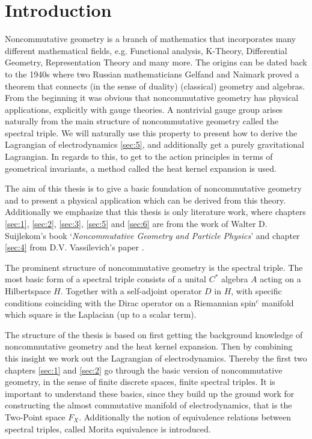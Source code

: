 \section{Introduction}
Noncommutative geometry is a branch of mathematics that incorporates many
different mathematical fields, e.g. Functional analysis, K-Theory,
Differential Geometry, Representation Theory and many more. The origins can
be dated back to the 1940s where two Russian mathematicians Gelfand and
Naimark proved a theorem that connects (in the sense of duality) (classical)
geometry and algebras. From the beginning it was obvious that noncommutative
geometry has physical applications, explicitly with gauge theories. A
nontrivial gauge group arises naturally from the main structure of
noncommutative geometry called the spectral triple. We will naturally use
this property to present how to derive the Lagrangian of electrodynamics
\ref{sec:5}, and additionally get a purely gravitational Lagrangian.
In regards to this, to get to the action principles in terms of geometrical
invariants, a method called the heat kernel expansion is used.

The aim of this thesis is to give a basic foundation of noncommutative
geometry and to present a physical application which can be derived from this
theory. Additionally we emphasize that this thesis is only literature work,
where chapters \ref{sec:1}, \ref{sec:2}, \ref{sec:3}, \ref{sec:5} and
\ref{sec:6} are from the work of Walter D. Suijlekom's book
`\textit{Noncommutative Geometry and Particle Physics}' \cite{ncgwalter} and
chapter \ref{sec:4} from D.V. Vassilevich's paper \cite{heatkernel}.

The prominent structure of noncommutative geometry is the spectral triple.
The most basic form of a spectral triple consists of a unital $C^*$ algebra
$A$ acting on a Hilbertspace $H$. Together with a self-adjoint operator $D$ in
$H$, with specific conditions coinciding with the Dirac operator on
a Riemannian spin$^c$ manifold which square is the Laplacian (up to a scalar
term).

The structure of the thesis is based on first getting the background
knowledge of noncommutative geometry and the heat kernel expansion. Then by
combining this insight we work out the Lagrangian of electrodynamics. Thereby
the first two chapters \ref{sec:1} and \ref{sec:2} go through the basic
version of noncommutative geometry, in the sense of finite discrete spaces,
finite spectral triples. It is important to understand these basics, since
they build up the ground work for constructing the almost commutative
manifold of electrodynamics, that is the Two-Point space $F_X$. Additionally
the notion of equivalence relations between spectral triples, called Morita
equivalence is introduced.

